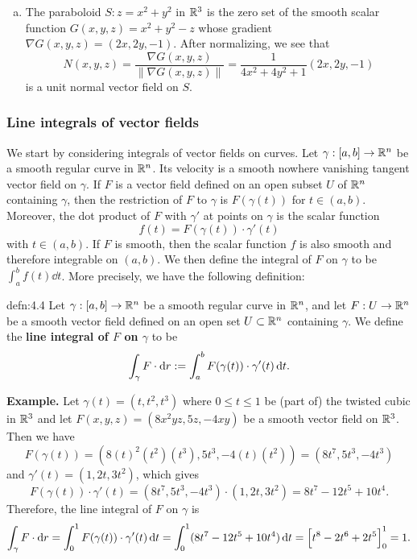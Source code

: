 \begin{enumerate}[(1)]
\begin{enumerate}[(a)]
        \item The paraboloid $S : z = x^2 + y^2$ in $\mathbb{R}^3$ is the zero 
        set of the smooth scalar function $G(x, y, z) = x^2 + y^2 - z$ 
        whose gradient $\nabla G(x, y, z) = (2x, 2y, -1)$. After normalizing, 
        we see that 
        \[ N(x, y, z) = \frac{\nabla G(x, y, z)}{\|\nabla G(x, y, z)\|} 
        = \frac{1}{4x^2 + 4y^2 + 1} (2x, 2y, -1) \] 
        is a unit normal vector field on $S$. 
    \end{enumerate}
\end{enumerate}

\subsubsection{Line integrals of vector fields} \label{subsubsec:4.2.1}
We start by considering integrals of vector fields on curves. Let 
$\gamma : [a, b] \to \mathbb{R}^n$ be a smooth regular curve in $\mathbb{R}^n$. Its 
velocity is a smooth nowhere vanishing tangent vector field on $\gamma$.
If $F$ is a vector field defined on an open subset $U$ of $\mathbb{R}^n$ containing 
$\gamma$, then the restriction of $F$ to $\gamma$ is $F(\gamma(t))$ for 
$t \in (a, b)$. Moreover, the dot product of $F$ with $\gamma'$ at points on 
$\gamma$ is the scalar function 
\[ f(t) = F(\gamma(t)) \cdot \gamma'(t) \] 
with $t \in (a, b)$. If $F$ is smooth, then the scalar function $f$ is 
also smooth and therefore integrable on $(a, b)$. We then define 
the integral of $F$ on $\gamma$ to be $\int_a^b f(t)\dd t$. More precisely, 
we have the following definition: 

\begin{defn}{defn:4.4}
    Let $\gamma : [a, b] \to \mathbb{R}^n$ be a smooth regular curve in $\mathbb{R}^n$, 
    and let $F : U \to \mathbb{R}^n$ be a smooth vector field defined on an 
    open set $U \subset \mathbb{R}^n$ containing $\gamma$. We define 
    the {\bf line integral of $F$ on $\gamma$} to be 
    \[ \int_\gamma F\cdot {\rm d}r := \int_a^b F(\gamma(t)) \cdot \gamma'(t) \,\mathrm{d} t. \] 
\end{defn}\vspace{-0.25cm}

{\bf Example.} Let $\gamma(t) = (t, t^2, t^3)$ where $0 \leq t \leq 1$ 
be (part of) the twisted cubic in $\mathbb{R}^3$ and let $F(x, y, z) = (8x^2yz, 5z, -4xy)$ 
be a smooth vector field on $\mathbb{R}^3$. Then we have 
\[ F(\gamma(t)) = (8(t)^2(t^2)(t^3), 5t^3, -4(t)(t^2)) = (8t^7, 5t^3, -4t^3) \] 
and $\gamma'(t) = (1, 2t, 3t^2)$, which gives 
\[ F(\gamma(t)) \cdot \gamma'(t) = (8t^7, 5t^3, -4t^3) \cdot 
(1, 2t, 3t^2) = 8t^7 - 12t^5 + 10t^4. \] 
Therefore, the line integral of $F$ on $\gamma$ is 
\[ \int_\gamma F\cdot{\rm d}r = \int_0^1 F(\gamma(t)) \cdot \gamma'(t)\,\mathrm{d} t 
= \int_0^1 (8t^7 - 12t^5 + 10t^4)\,\mathrm{d} t = \Big[ t^8 - 2t^6 + 2t^5 \Big]_0^1 
= 1. \] 


